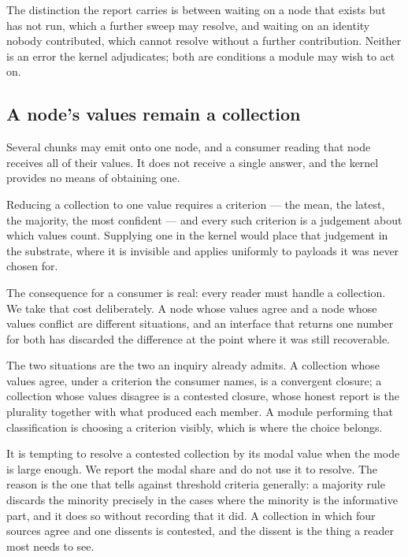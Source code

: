 The distinction the report carries is between waiting on a node that exists
but has not run, which a further sweep may resolve, and waiting on an identity
nobody contributed, which cannot resolve without a further contribution.
Neither is an error the kernel adjudicates; both are conditions a module may
wish to act on.

\subsection{A node's values remain a collection}

Several chunks may emit onto one node, and a consumer reading that node
receives all of their values. It does not receive a single answer, and the
kernel provides no means of obtaining one.

\begin{remark}
\label{rem:no-reduction}
Reducing a collection to one value requires a criterion --- the mean, the
latest, the majority, the most confident --- and every such criterion is a
judgement about which values count. Supplying one in the kernel would place
that judgement in the substrate, where it is invisible and applies uniformly
to payloads it was never chosen for.

The consequence for a consumer is real: every reader must handle a
collection. We take that cost deliberately. A node whose values agree and a
node whose values conflict are different situations, and an interface that
returns one number for both has discarded the difference at the point where
it was still recoverable.
\end{remark}

The two situations are the two an inquiry already admits. A collection whose
values agree, under a criterion the consumer names, is a convergent closure; a
collection whose values disagree is a contested closure, whose honest report
is the plurality together with what produced each member. A module performing
that classification is choosing a criterion visibly, which is where the choice
belongs.

\begin{remark}
\label{rem:majority}
It is tempting to resolve a contested collection by its modal value when the
mode is large enough. We report the modal share and do not use it to resolve.
The reason is the one that tells against threshold criteria generally: a
majority rule discards the minority precisely in the cases where the minority
is the informative part, and it does so without recording that it did. A collection in which four sources agree and one
dissents is contested, and the dissent is the thing a reader most needs to
see.
\end{remark}
